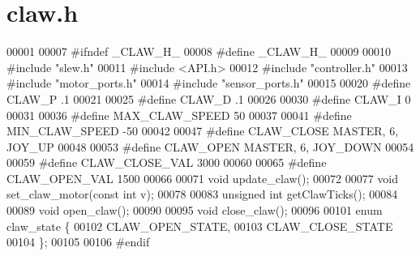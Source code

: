 \section{claw.\+h}
\label{claw_8h_source}

\begin{DoxyCode}
00001 
00007 \textcolor{preprocessor}{#ifndef \_CLAW\_H\_}
00008 \textcolor{preprocessor}{#define \_CLAW\_H\_}
00009 
00010 \textcolor{preprocessor}{#include "slew.h"}
00011 \textcolor{preprocessor}{#include <API.h>}
00012 \textcolor{preprocessor}{#include "controller.h"}
00013 \textcolor{preprocessor}{#include "motor_ports.h"}
00014 \textcolor{preprocessor}{#include "sensor_ports.h"}
00015 
00020 \textcolor{preprocessor}{#define CLAW\_P .1}
00021 
00025 \textcolor{preprocessor}{#define CLAW\_D .1}
00026 
00030 \textcolor{preprocessor}{#define CLAW\_I 0}
00031 
00036 \textcolor{preprocessor}{#define MAX\_CLAW\_SPEED 50}
00037 
00041 \textcolor{preprocessor}{#define MIN\_CLAW\_SPEED -50}
00042 
00047 \textcolor{preprocessor}{#define CLAW\_CLOSE MASTER, 6, JOY\_UP}
00048 
00053 \textcolor{preprocessor}{#define CLAW\_OPEN MASTER, 6, JOY\_DOWN}
00054 
00059 \textcolor{preprocessor}{#define CLAW\_CLOSE\_VAL 3000}
00060 
00065 \textcolor{preprocessor}{#define CLAW\_OPEN\_VAL 1500}
00066 
00071 \textcolor{keywordtype}{void} update_claw();
00072 
00077 \textcolor{keywordtype}{void} set_claw_motor(\textcolor{keyword}{const} \textcolor{keywordtype}{int} v);
00078 
00083 \textcolor{keywordtype}{unsigned} \textcolor{keywordtype}{int} getClawTicks();
00084 
00089 \textcolor{keywordtype}{void} open_claw();
00090 
00095 \textcolor{keywordtype}{void} close_claw();
00096 
00101 \textcolor{keyword}{enum} claw_state \{
00102   CLAW_OPEN_STATE,
00103   CLAW_CLOSE_STATE
00104 \};
00105 
00106 \textcolor{preprocessor}{#endif}
\end{DoxyCode}
